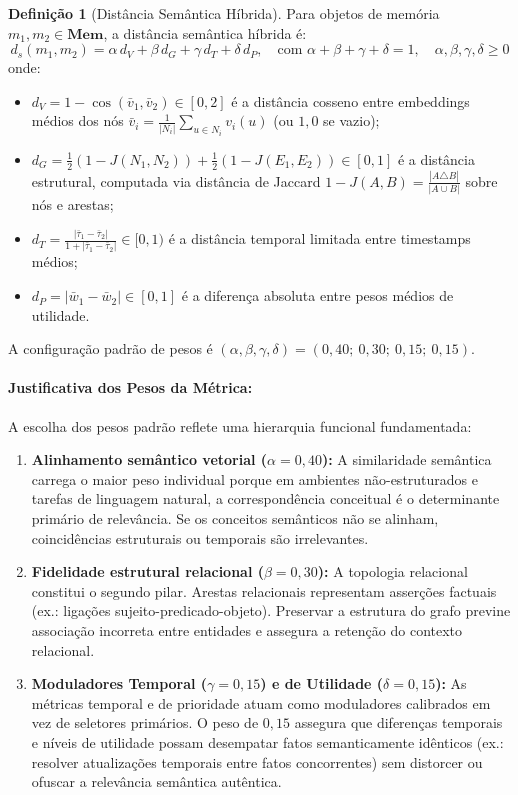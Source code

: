 \documentclass[11pt,a4paper]{article}
\theoremstyle{definition}
\newtheorem{definicao}{Defini\c{c}\~ao}[section]
\begin{document}
\begin{definicao}[Dist\^ancia Sem\^antica H\'ibrida]
Para objetos de mem\'oria $m_1, m_2 \in \mathbf{Mem}$, a dist\^ancia sem\^antica h\'ibrida \'e:
\[
d_s(m_1, m_2) = \alpha\, d_V + \beta\, d_G + \gamma\, d_T + \delta\, d_P, \quad \text{com } \alpha + \beta + \gamma + \delta = 1, \quad \alpha,\beta,\gamma,\delta \geq 0
\]
onde:
\begin{itemize}
    \item $d_V = 1 - \cos(\bar{v}_1, \bar{v}_2) \in [0, 2]$ \'e a dist\^ancia cosseno entre embeddings m\'edios dos n\'os $\bar{v}_i = \frac{1}{|N_i|}\sum_{u \in N_i} v_i(u)$ (ou $1{,}0$ se vazio);
    \item $d_G = \frac{1}{2}(1 - J(N_1, N_2)) + \frac{1}{2}(1 - J(E_1, E_2)) \in [0, 1]$ \'e a dist\^ancia estrutural, computada via dist\^ancia de Jaccard $1 - J(A, B) = \frac{|A \triangle B|}{|A \cup B|}$ sobre n\'os e arestas;
    \item $d_T = \frac{|\bar{\tau}_1 - \bar{\tau}_2|}{1 + |\bar{\tau}_1 - \bar{\tau}_2|} \in [0, 1)$ \'e a dist\^ancia temporal limitada entre timestamps m\'edios;
    \item $d_P = |\bar{w}_1 - \bar{w}_2| \in [0, 1]$ \'e a diferen\c{c}a absoluta entre pesos m\'edios de utilidade.
\end{itemize}
A configura\c{c}\~ao padr\~ao de pesos \'e $(\alpha, \beta, \gamma, \delta) = (0{,}40;\ 0{,}30;\ 0{,}15;\ 0{,}15)$.
\end{definicao}

\paragraph{Justificativa dos Pesos da M\'etrica:}
A escolha dos pesos padr\~ao reflete uma hierarquia funcional fundamentada:
\begin{enumerate}
    \item \textbf{Alinhamento sem\^antico vetorial ($\alpha = 0{,}40$):} A similaridade sem\^antica carrega o maior peso individual porque em ambientes n\~ao-estruturados e tarefas de linguagem natural, a correspond\^encia conceitual \'e o determinante prim\'ario de relev\^ancia. Se os conceitos sem\^anticos n\~ao se alinham, coincid\^encias estruturais ou temporais s\~ao irrelevantes.
    \item \textbf{Fidelidade estrutural relacional ($\beta = 0{,}30$):} A topologia relacional constitui o segundo pilar. Arestas relacionais representam asser\c{c}\~oes factuais (ex.: liga\c{c}\~oes sujeito-predicado-objeto). Preservar a estrutura do grafo previne associa\c{c}\~ao incorreta entre entidades e assegura a reten\c{c}\~ao do contexto relacional.
    \item \textbf{Moduladores Temporal ($\gamma = 0{,}15$) e de Utilidade ($\delta = 0{,}15$):} As m\'etricas temporal e de prioridade atuam como moduladores calibrados em vez de seletores prim\'arios. O peso de $0{,}15$ assegura que diferen\c{c}as temporais e n\'iveis de utilidade possam desempatar fatos semanticamente id\^enticos (ex.: resolver atualiza\c{c}\~oes temporais entre fatos concorrentes) sem distorcer ou ofuscar a relev\^ancia sem\^antica aut\^entica.
\end{enumerate}
\end{document}
